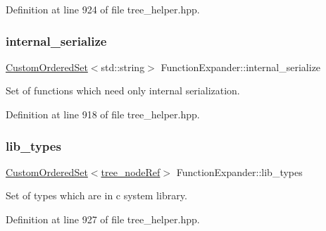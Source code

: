 Definition at line 924 of file tree\+\_\+helper.\+hpp.

\mbox{\label{classFunctionExpander_ad53e6ea711a172f209a7fbf437fc2c30}} 
\subsubsection{\texorpdfstring{internal\+\_\+serialize}{internal\_serialize}}
{\footnotesize\ttfamily \hyperlink{classCustomOrderedSet}{Custom\+Ordered\+Set}$<$std\+::string$>$ Function\+Expander\+::internal\+\_\+serialize\hspace{0.3cm}{\ttfamily [private]}}



Set of functions which need only internal serialization. 



Definition at line 918 of file tree\+\_\+helper.\+hpp.

\mbox{\label{classFunctionExpander_ac2448a1dbf050de234c4a698f360f2f5}} 
\subsubsection{\texorpdfstring{lib\+\_\+types}{lib\_types}}
{\footnotesize\ttfamily \hyperlink{classCustomOrderedSet}{Custom\+Ordered\+Set}$<$\hyperlink{tree__node_8hpp_a6ee377554d1c4871ad66a337eaa67fd5}{tree\+\_\+node\+Ref}$>$ Function\+Expander\+::lib\+\_\+types\hspace{0.3cm}{\ttfamily [private]}}



Set of types which are in c system library. 



Definition at line 927 of file tree\+\_\+helper.\+hpp.

\mbox{\label{classFunctionExpander_ac03b5e196a1f2c49e114fc442b1b6b2a}} 
